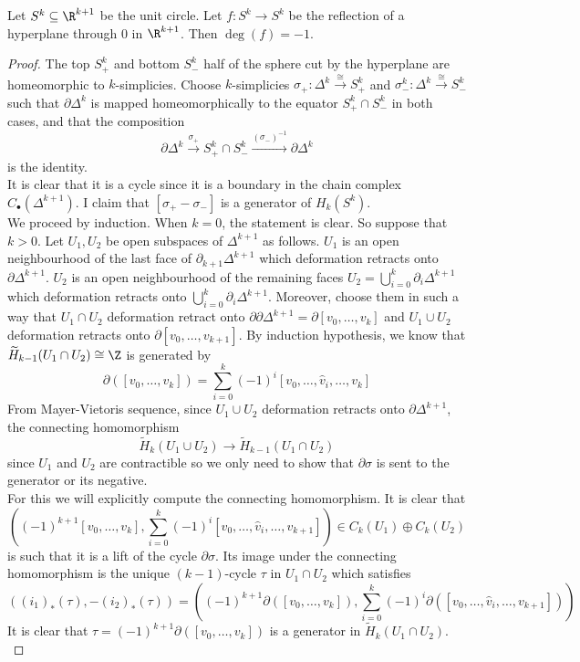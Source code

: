 \documentclass[a4paper]{article}
\begin{document}
\begin{lmm}{}{} Let $S^k\subseteq\R^{k+1}$ be the unit circle. Let $f:S^k\to S^k$ be the reflection of a hyperplane through $0$ in $\R^{k+1}$. Then $\deg(f)=-1$. 
\begin{proof}
The top $S_+^k$ and bottom $S_-^k$ half of the sphere cut by the hyperplane  are homeomorphic to $k$-simplicies. Choose $k$-simplicies $\sigma_+:\Delta^k\overset{\cong}{\longrightarrow}S_+^k$ and $\sigma_-^k:\Delta^k\overset{\cong}{\longrightarrow}S_-^k$ such that $\partial\Delta^k$ is mapped homeomorphically to the equator $S_+^k\cap S_-^k$ in both cases, and that the composition $$\partial\Delta^k\overset{\sigma_+}{\longrightarrow}S_+^k\cap S_-^k\overset{(\sigma_-)^{-1}}{\longrightarrow}\partial\Delta^k$$ is the identity. \\

It is clear that it is a cycle since it is a boundary in the chain complex $C_\bullet(\Delta^{k+1})$. I claim that $[\sigma_+-\sigma_-]$ is a generator of $H_k(S^k)$. \\

We proceed by induction. When $k=0$, the statement is clear. So suppose that $k>0$. Let $U_1,U_2$ be open subspaces of $\Delta^{k+1}$ as follows. $U_1$ is an open neighbourhood of the last face of $\partial_{k+1}\Delta^{k+1}$ which deformation retracts onto $\partial\Delta^{k+1}$. $U_2$ is an open neighbourhood of the remaining faces $U_2=\bigcup_{i=0}^k\partial_i\Delta^{k+1}$ which deformation retracts onto $\bigcup_{i=0}^k\partial_i\Delta^{k+1}$. Moreover, choose them in such a way that $U_1\cap U_2$ deformation retract onto $\partial\partial\Delta^{k+1}=\partial[v_0,\dots,v_k]$ and $U_1\cup U_2$ deformation retracts onto $\partial[v_0,\dots,v_{k+1}]$. By induction hypothesis, we know that $\widetilde{H}_{k-1}(U_1\cap U_2)\cong\Z$ is generated by $$\partial([v_0,\dots,v_k])=\sum_{i=0}^k(-1)^i[v_0,\dots,\hat{v}_i,\dots,v_k]$$ From Mayer-Vietoris sequence, since $U_1\cup U_2$ deformation retracts onto $\partial\Delta^{k+1}$, the connecting homomorphism $$\widetilde{H}_k(U_1\cup U_2)\to\widetilde{H}_{k-1}(U_1\cap U_2)$$ since $U_1$ and $U_2$ are contractible so we only need to show that $\partial\sigma$ is sent to the generator or its negative. \\

For this we will explicitly compute the connecting homomorphism. It is clear that $$\left((-1)^{k+1}[v_0,\dots,v_k],\sum_{i=0}^k(-1)^i[v_0,\dots,\hat{v}_i,\dots,v_{k+1}]\right)\in C_k(U_1)\oplus C_k(U_2)$$ is such that it is a lift of the cycle $\partial\sigma$. Its image under the connecting homomorphism is the unique $(k-1)$-cycle $\tau$ in $U_1\cap U_2$ which satisfies $$\left((i_1)_\ast(\tau),-(i_2)_\ast(\tau)\right)=\left((-1)^{k+1}\partial([v_0,\dots,v_k]),\sum_{i=0}^k(-1)^i\partial([v_0,\dots,\hat{v}_i,\dots,v_{k+1}])\right)$$ It is clear that $\tau=(-1)^{k+1}\partial([v_0,\dots,v_k])$ is a generator in $\widetilde{H}_k(U_1\cap U_2)$. \\


\end{proof}
\end{lmm}
\end{document}

